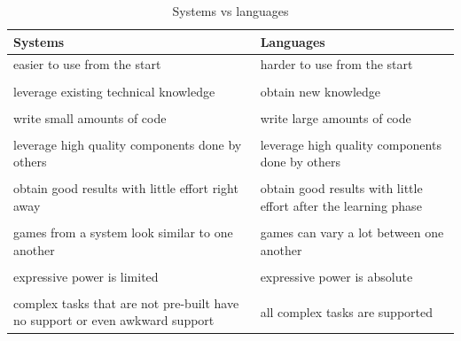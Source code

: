 \begin{table} 
\center
\begin{tabular}{ | p{7cm} | p{7cm} |}

\hline
Systems & Languages \\
\hline

easier to use from the start & harder to use from the start \\ & \\

leverage existing technical knowledge & obtain new knowledge \\ & \\

write small amounts of code & write large amounts of code \\ & \\

leverage high quality components done by others & leverage high quality components done by others \\ & \\

obtain good results with little effort right away & obtain good results with little effort after the learning phase \\ & \\

games from a system look similar to one another & games can vary a lot between one another \\ & \\

expressive power is limited & expressive power is absolute \\ & \\

complex tasks that are not pre-built have no support or even awkward support & all complex tasks are supported \\

\hline

\end{tabular}
\caption{Systems vs languages}
\label{tab:systems vs languages}
\end{table}


